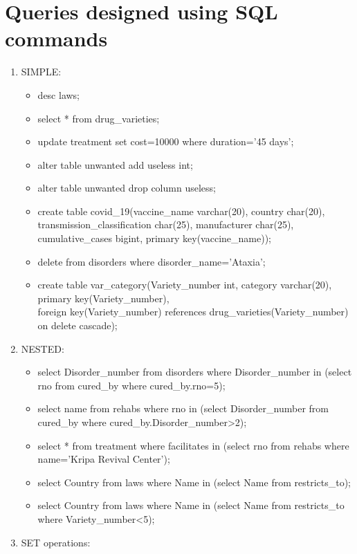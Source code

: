 \documentclass{report}
\begin{document}
\section{Queries designed using SQL commands}
\renewcommand{\labelenumii}{\Roman{enumii}}
\begin{enumerate}
\item SIMPLE:
    \begin{itemize}
        \item desc laws;
        \item select * from drug\_varieties;
        \item update treatment set cost=10000 where duration='45 days';
        \item alter table unwanted add useless int;
        \item alter table unwanted drop column useless;
        \item create table covid\_19(vaccine\_name varchar(20), country char(20), transmission\_classification char(25), manufacturer char(25), cumulative\_cases bigint, primary key(vaccine\_name));
        \item delete from disorders where disorder\_name='Ataxia';
        \item create table var\_category(Variety\_number int, category varchar(20), primary key(Variety\_number),\\
                foreign key(Variety\_number) references drug\_varieties(Variety\_number) on delete cascade);
    \end{itemize}
\item NESTED:
    \begin{itemize}
        \item select Disorder\_number from disorders where Disorder\_number in (select rno from cured\_by where cured\_by.rno=5);
        \item select name from rehabs where rno in (select Disorder\_number from cured\_by where cured\_by.Disorder\_number>2);
        \item select * from treatment where facilitates in (select rno from rehabs where name='Kripa Revival Center');
        \item select Country from laws where Name in (select Name from restricts\_to);
        \item select Country from laws where Name in (select Name from restricts\_to where Variety\_number<5);
    \end{itemize}
\item SET operations:
    \begin{itemize}

\end{itemize}
\end{enumerate}
\end{document}
